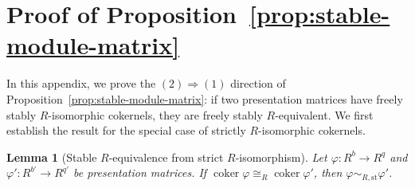 \documentclass[aps,prx,english,superscriptaddress,twocolumn,tightenlines,showpacs,longbibliography,floatfix,amsfonts]{revtex4-2}
\newtheorem{lemma}{Lemma}
\theoremstyle{remark}
\theoremstyle{definition}
\begin{document}
\section{Proof of Proposition~\ref{prop:stable-module-matrix}}
\label{app:stable-module-matrix-proof}

In this appendix, we prove the $(2) \Rightarrow (1)$ direction of Proposition~\ref{prop:stable-module-matrix}: if two presentation matrices have freely stably \(R\)-isomorphic cokernels, they are freely stably \(R\)-equivalent. We first establish the result for the special case of strictly \(R\)-isomorphic cokernels.

\begin{lemma}[Stable \(R\)-equivalence from strict \(R\)-isomorphism]
	\label{lem:strict-iso-stable-eq}
	Let $\varphi \colon R^b \to R^q$ and $\varphi' \colon R^{b'} \to R^{q'}$ be presentation matrices. If $\operatorname{coker}\varphi \cong_R \operatorname{coker}\varphi'$, then $\varphi \sim_{R,\mathrm{st}} \varphi'$.
\end{lemma}
\end{document}
